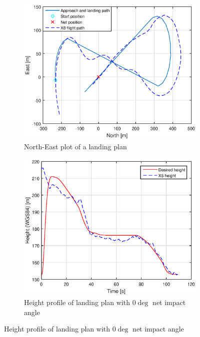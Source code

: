 \newpage
\begin{figure}[H]
\begin{subfigure}[H]{1\textwidth}
	\centering
		\includegraphics[width=1\textwidth]{figs/Experiment/NorthEast31mai105034.eps}
		\caption{North-East plot of a landing plan}
		\label{Fig:NorthEast31mai105034}
\end{subfigure}
\begin{subfigure}[H]{1\textwidth}
		\includegraphics[width=1\textwidth]{figs/Experiment/Height31mai105034.eps}
		\caption{Height profile of landing plan with $0 \deg$ net impact angle}
		\label{Fig:Height31mai31mai105034}
\end{subfigure}
\end{figure}
